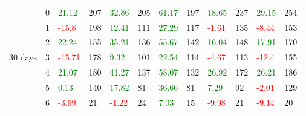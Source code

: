 \begin{table}[!htb]
\begin{adjustwidth}{-0.8in}{-0.9in}
\begin{tabular}{|p{4em}|p{2em}|p{3em}|p{3em}|p{3em}|p{3em}|p{3em}|p{3em}|p{3em}|p{3em}|p{3em}|p{3em}|}
            & 0 & \textcolor{green}{21.12} & 207 & \textcolor{green}{32.86} & 205 & \textcolor{green}{61.17} & 197 & \textcolor{green}{18.65} & 237 & \textcolor{green}{29.15} & 254\\\cline{3-12}
            & 1 & \textcolor{red}{-15.8} & 198 & \textcolor{green}{12.41} & 111 & \textcolor{green}{27.29} & 117 & \textcolor{red}{-1.61} & 135 & \textcolor{red}{-8.44} & 153\\\cline{3-12}
            & 2 & \textcolor{green}{22.24} & 155 & \textcolor{green}{35.21} & 136 & \textcolor{green}{55.67} & 142 & \textcolor{green}{16.04} & 148 & \textcolor{green}{17.91} & 170\\\cline{3-12}
            30 days & 3 & \textcolor{red}{-15.71} & 178 & \textcolor{green}{9.32} & 101 & \textcolor{green}{22.54} & 114 & \textcolor{red}{-4.67} & 113 & \textcolor{red}{-12.4} & 155\\\cline{3-12}
            & 4 & \textcolor{green}{21.07} & 180 & \textcolor{green}{41.27} & 137 & \textcolor{green}{58.07} & 132 & \textcolor{green}{26.92} & 172 & \textcolor{green}{26.21} & 186\\\cline{3-12}
            & 5 & \textcolor{green}{0.13} & 140 & \textcolor{green}{17.82} & 81 & \textcolor{green}{36.66} & 81 & \textcolor{green}{7.29} & 92 & \textcolor{red}{-2.01} & 129\\\cline{3-12}
            & 6 & \textcolor{red}{-3.69} & 21 & \textcolor{red}{-1.22} & 24 & \textcolor{green}{7.03} & 15 & \textcolor{red}{-9.98} & 21 & \textcolor{red}{-9.14} & 20\\\hline\hline


\end{tabular}
\end{adjustwidth}
\end{table}
